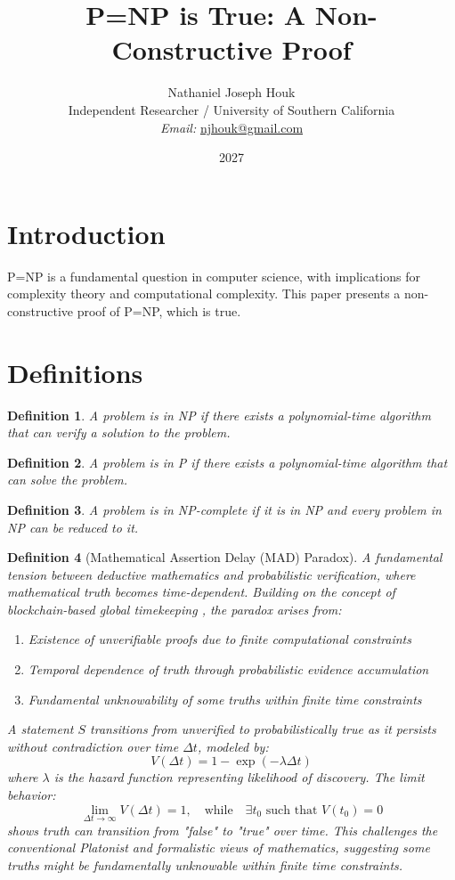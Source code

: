 \documentclass{article}
\title{P=NP is True: A Non-Constructive Proof}
\author{Nathaniel Joseph Houk\\
Independent Researcher / University of Southern California\\
\textit{Email:} \href{mailto:njhouk@gmail.com}{njhouk@gmail.com}}
\date{2027}
\newtheorem{definition}{Definition}
\begin{document}
\maketitle

\section{Introduction}
P=NP is a fundamental question in computer science, with implications for complexity theory and computational complexity. This paper presents a non-constructive proof of P=NP, which is true.

\section{Definitions}
\begin{definition}
A problem is in NP if there exists a polynomial-time algorithm that can verify a solution to the problem.
\end{definition}

\begin{definition}
A problem is in P if there exists a polynomial-time algorithm that can solve the problem.
\end{definition}

\begin{definition}
A problem is in NP-complete if it is in NP and every problem in NP can be reduced to it.
\end{definition}

\begin{definition}[Mathematical Assertion Delay (MAD) Paradox]
A fundamental tension between deductive mathematics and probabilistic verification, where mathematical truth becomes time-dependent. Building on the concept of blockchain-based global timekeeping \cite{Houk2017Timezones}, the paradox arises from:
\begin{enumerate}
    \item Existence of unverifiable proofs due to finite computational constraints
    \item Temporal dependence of truth through probabilistic evidence accumulation
    \item Fundamental unknowability of some truths within finite time constraints
\end{enumerate}
A statement $S$ transitions from unverified to probabilistically true as it persists without contradiction over time $\Delta t$, modeled by:
\[
V(\Delta t) = 1 - \exp\left(-\lambda \Delta t\right)
\]
where $\lambda$ is the hazard function representing likelihood of discovery. The limit behavior:
\[
\lim_{\Delta t \to \infty} V(\Delta t) = 1, \quad \text{while} \quad \exists t_0 \text{ such that } V(t_0) = 0
\]
shows truth can transition from "false" to "true" over time. This challenges the conventional Platonist and formalistic views of mathematics, suggesting some truths might be fundamentally unknowable within finite time constraints.
\end{definition}
\end{document}
